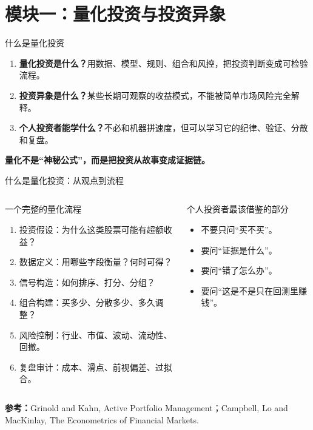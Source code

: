 \documentclass[UTF8,aspectratio=169,11pt]{ctexbeamer}
\newcommand{\source}[1]{\vfill{\scriptsize\color{aqgray}\textbf{参考：}#1}}
\begin{document}
\section{模块一：量化投资与投资异象}

\begin{frame}{什么是量化投资}
\begin{enumerate}
\item \textbf{量化投资是什么？}\quad 用数据、模型、规则、组合和风控，把投资判断变成可检验流程。
\item \textbf{投资异象是什么？}\quad 某些长期可观察的收益模式，不能被简单市场风险完全解释。
\item \textbf{个人投资者能学什么？}\quad 不必和机器拼速度，但可以学习它的纪律、验证、分散和复盘。
\end{enumerate}
\vspace{0.3cm}
\begin{center}
\Large \textbf{量化不是“神秘公式”，而是把投资从故事变成证据链。}
\end{center}
\end{frame}

\begin{frame}{什么是量化投资：从观点到流程}
\begin{columns}[T,totalwidth=\textwidth]
\begin{keybox}{一个完整的量化流程}
\begin{enumerate}
\item 投资假设：为什么这类股票可能有超额收益？
\item 数据定义：用哪些字段衡量？何时可得？
\item 信号构造：如何排序、打分、分组？
\item 组合构建：买多少、分散多少、多久调整？
\item 风险控制：行业、市值、波动、流动性、回撤。
\item 复盘审计：成本、滑点、前视偏差、过拟合。
\end{enumerate}
\end{keybox}
\begin{casebox}{个人投资者最该借鉴的部分}
\begin{itemize}
\item 不要只问“买不买”。
\item 要问“证据是什么”。
\item 要问“错了怎么办”。
\item 要问“这是不是只在回测里赚钱”。
\end{itemize}
\end{casebox}
\end{columns}
\source{Grinold and Kahn, Active Portfolio Management；Campbell, Lo and MacKinlay, The Econometrics of Financial Markets.}
\end{frame}
\end{document}

